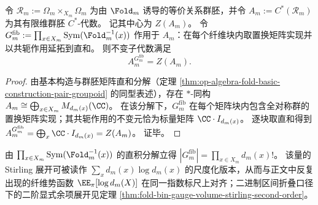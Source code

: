 \begin{theorem}[纤维内置换共轭不变元即中心]\label{thm:op-algebra-fold-fiber-fixedpoints-center}
令 \(\mathcal R_m:=\Omega_m\times_{X_m}\Omega_m\) 为由 \(\Fold_m\) 诱导的等价关系群胚，并令
\(
A_m:=C^\ast(\mathcal R_m)
\)
为其有限维群胚 \(C^\ast\)-代数。
记其中心为 \(Z(A_m)\)。
令
\(
G_m^{\mathrm{fib}}:=\prod_{x\in X_m}\mathrm{Sym}(\Fold_m^{-1}(x))
\)
作用于 \(A_m\)：在每个纤维块内取置换矩阵实现并以共轭作用延拓到直和。
则不变子代数满足
\[
A_m^{G_m^{\mathrm{fib}}}=Z(A_m).
\]
\end{theorem}
\begin{proof}
由基本构造与群胚矩阵直和分解（定理 \ref{thm:op-algebra-fold-basic-construction-pair-groupoid} 的同型表述），存在 \(\ast\)-同构
\(
A_m\cong\bigoplus_{x\in X_m} M_{d_m(x)}(\CC)
\)。
在该分解下，\(G_m^{\mathrm{fib}}\) 在每个矩阵块内包含全对称群的置换矩阵实现；其共轭作用的不变元恰为标量矩阵 \(\CC\cdot I_{d_m(x)}\)。
逐块取直和得到
\(
A_m^{G_m^{\mathrm{fib}}}=\bigoplus_x \CC\cdot I_{d_m(x)}=Z(A_m)
\)。
证毕。
\end{proof}

\begin{remark}[纤维置换体积与对数势]\label{rem:op-algebra-fold-fiber-permutation-volume}
由 \(\prod_{x\in X_m}\mathrm{Sym}(\Fold_m^{-1}(x))\) 的直积分解立得
\(
|G_m^{\mathrm{fib}}|=\prod_{x\in X_m} d_m(x)!
\)。
该量的 Stirling 展开可被读作 \(\sum_x d_m(x)\log d_m(x)\) 的尺度化版本，从而与正文中反复出现的纤维势函数 \(\EE_{\pi}[\log d_m(X)]\) 在同一指数标尺上对齐；二进制区间折叠口径下的二阶显式余项展开见定理 \ref{thm:fold-bin-gauge-volume-stirling-second-order}。
\end{remark}
